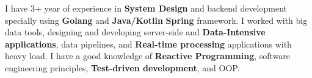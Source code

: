 

\begin{cvparagraph}

I have 3+ year of experience in \textbf{System Design} and backend development specially using \textbf{Golang} and \textbf{Java/Kotlin} \textbf{Spring} framework.
I worked with big data tools, designing and developing server-side and \textbf{Data-Intensive applications}, data pipelines, and \textbf{Real-time processing} applications with heavy load.
I have a good knowledge of \textbf{Reactive Programming}, software engineering principles, \textbf{Test-driven development}, and OOP.
\end{cvparagraph}